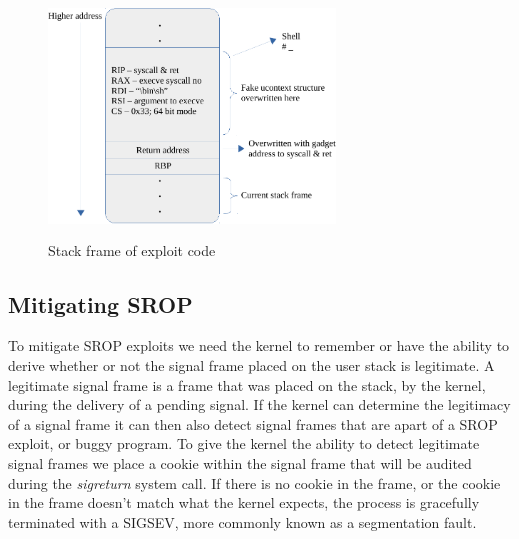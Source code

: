 \documentclass{sig-alternate-05-2015}
\begin{document}
\begin{figure}
\centering
\includegraphics[height=2.5in, width=3in]{exploit}
\caption{Stack frame of exploit code}
\end{figure}

\subsection{Mitigating SROP}
To mitigate SROP exploits we need the kernel to remember or have the ability to derive whether or not the signal frame placed on the user stack is legitimate. A legitimate signal frame is a frame that was placed on the stack, by the kernel, during the delivery of a pending signal. If the kernel can determine the legitimacy of a signal frame it can then also detect signal frames that are apart of a SROP exploit, or buggy program. To give the kernel the ability to detect legitimate signal frames we place a cookie within the signal frame that will be audited during the \textit{sigreturn} system call. If there is no cookie in the frame, or the cookie in the frame doesn't match what the kernel expects, the process is gracefully terminated with a SIGSEV, more commonly known as a segmentation fault.
\end{document}

